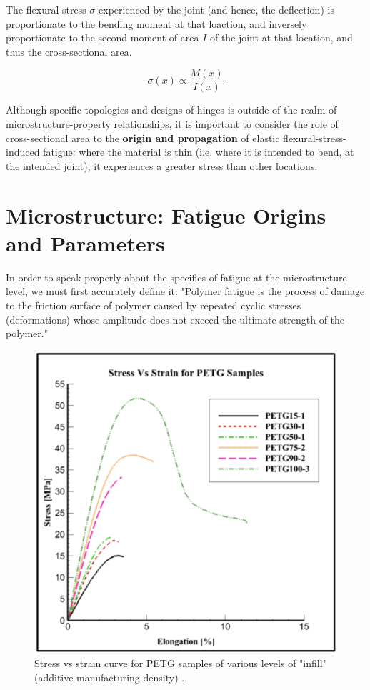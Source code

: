 \documentclass{report}
\begin{document}
The flexural stress $\sigma$ experienced by the joint (and hence, the deflection) is proportionate to the bending moment at that loaction, and inversely proportionate to the second moment of area $I$ of the joint at that location, and thus the cross-sectional area.

\begin{equation}
    \sigma (x) \propto \frac {M(x)}{I(x)}
\end{equation}

Although specific topologies and designs of hinges is outside of the realm of microstructure-property relationships, it is important to consider the role of cross-sectional area to the \textbf{origin and propagation} of elastic flexural-stress-induced fatigue: 
where the material is thin (i.e. where it is intended to bend, at the intended joint), it experiences a greater stress than other locations.

\section{Microstructure: Fatigue Origins and Parameters}

In order to speak properly about the specifics of fatigue at the microstructure level, we must first accurately define it: "Polymer fatigue is the process of damage to the friction surface of polymer caused by repeated cyclic stresses (deformations) whose amplitude does not exceed the ultimate strength of the polymer." \cite{Bogdanovich2013}

\begin{figure}[h]
    \label{fig:latch}
    \centering
    \includegraphics[width=\textwidth/2]{images/stressstrain.png}
    \hfill
    \caption{Stress vs strain curve for PETG samples of various levels of "infill" (additive manufacturing density) \cite{infill}.}
\end{figure}
\end{document}
